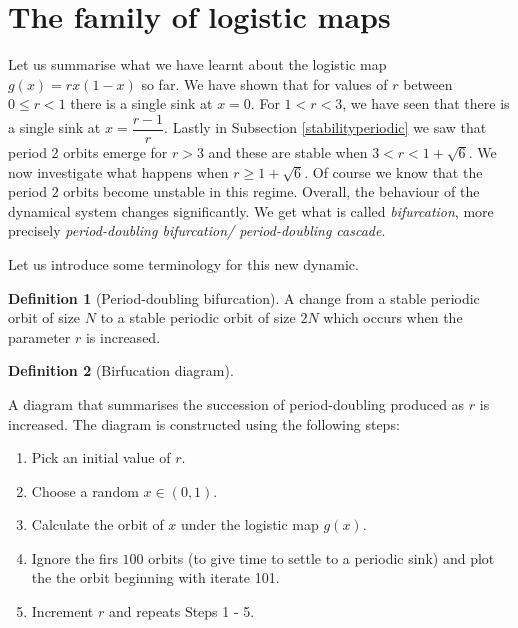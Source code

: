 \documentclass[
  a4paper,
  oneside,
  final]{krantz}
\providecommand{\tightlist}{%
  \setlength{\itemsep}{0pt}\setlength{\parskip}{0pt}}
\theoremstyle{definition}
\newtheorem{definition}{Definition}[chapter]
\theoremstyle{definition}
\theoremstyle{definition}
\theoremstyle{definition}
\theoremstyle{remark}
\begin{document}
\hypertarget{logisticfamily}{%
\section{The family of logistic maps}\label{logisticfamily}}

Let us summarise what we have learnt about the logistic map \(g(x) = rx(1-x)\) so far. We have shown that for values of \(r\) between \(0 \le r <1\) there is a single sink at \(x=0\). For \(1 < r < 3\), we have seen that there is a single sink at \(x = \dfrac{r-1}{r}\). Lastly in Subsection \ref{stabilityperiodic} we saw that period 2 orbits emerge for \(r >3\) and these are stable when \(3< r < 1+ \sqrt{6}\). We now investigate what happens when \(r \ge 1+ \sqrt{6}\). Of course we know that the period \(2\) orbits become unstable in this regime. Overall, the behaviour of the dynamical system changes significantly. We get what is called \emph{bifurcation}, more precisely \emph{period-doubling bifurcation/ period-doubling cascade}.

Let us introduce some terminology for this new dynamic.

\begin{definition}[Period-doubling bifurcation]
\protect\hypertarget{def:birfucation}{}\label{def:birfucation}A change from a stable periodic orbit of size \(N\) to a stable periodic orbit of size \(2N\) which occurs when the parameter \(r\) is increased.
\end{definition}

\begin{definition}[Birfucation diagram]
\protect\hypertarget{def:bifurcdiagram}{}\label{def:bifurcdiagram}

A diagram that summarises the succession of period-doubling produced as \(r\) is increased. The diagram is constructed using the following steps:

\begin{enumerate}
\def\labelenumi{\arabic{enumi}.}
\setcounter{enumi}{-1}
\tightlist
\item
  Pick an initial value of \(r\).
\item
  Choose a random \(x \in (0,1)\).
\item
  Calculate the orbit of \(x\) under the logistic map \(g(x)\).
\item
  Ignore the firs \(100\) orbits (to give time to settle to a periodic sink) and plot the the orbit beginning with iterate 101.
\item
  Increment \(r\) and repeats Steps 1 - 5.
\end{enumerate}

\end{definition}
\end{document}

